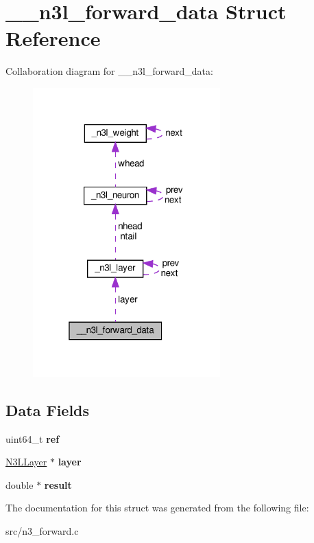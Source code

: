 \hypertarget{struct____n3l__forward__data}{}\section{\+\_\+\+\_\+n3l\+\_\+forward\+\_\+data Struct Reference}
\label{struct____n3l__forward__data}


Collaboration diagram for \+\_\+\+\_\+n3l\+\_\+forward\+\_\+data\+:\nopagebreak
\begin{figure}[H]
\begin{center}
\leavevmode
\includegraphics[width=205pt]{struct____n3l__forward__data__coll__graph}
\end{center}
\end{figure}
\subsection*{Data Fields}
\begin{DoxyCompactItemize}
\item 
\mbox{\label{struct____n3l__forward__data_ada78b9bd1418f8dccab76319afb7d64b}} 
uint64\+\_\+t {\bfseries ref}
\item 
\mbox{\label{struct____n3l__forward__data_aaeb45910cc54c7f3a770dbd124477fc2}} 
\hyperlink{struct__n3l__layer}{N3\+L\+Layer} $\ast$ {\bfseries layer}
\item 
\mbox{\label{struct____n3l__forward__data_ac870eae5ce14b297b5d78cc7112c8cec}} 
double $\ast$ {\bfseries result}
\end{DoxyCompactItemize}


The documentation for this struct was generated from the following file\+:\begin{DoxyCompactItemize}
\item 
src/n3\+\_\+forward.\+c\end{DoxyCompactItemize}

